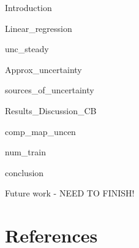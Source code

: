 \documentclass[a4paper]{jpconf}
\newcommand{\blCom}[1]{\begingroup\sffamily\color{blue} #1 \endgroup}  %
\begin{document}
\blCom{Introduction} %


\blCom{Linear\_regression}


\blCom{unc\_steady}


\blCom{Approx\_uncertainty}


\blCom{sources\_of\_uncertainty}


\blCom{Results\_Discussion\_CB}



\blCom{comp\_map\_uncen}


\blCom{num\_train}



\blCom{conclusion}


\blCom{Future work - NEED TO FINISH!}


\section*{References}



%
\end{document}
